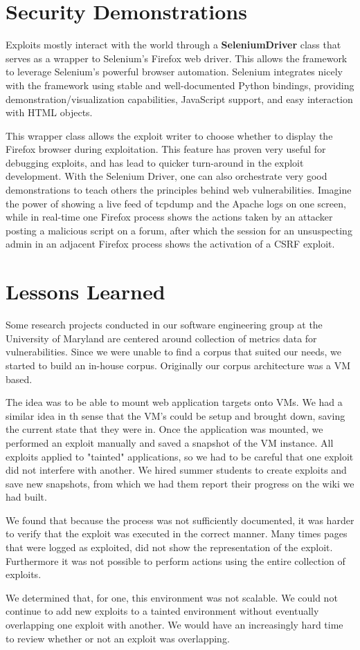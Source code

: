 \documentclass[letterpaper,twocolumn,10pt]{article}
\begin{document}
\section{Security Demonstrations}

Exploits mostly interact with the world through a {\bf SeleniumDriver} class that serves as a wrapper to Selenium's Firefox web driver. This allows the framework to leverage Selenium's powerful browser automation. Selenium integrates nicely with the framework using stable and well-documented Python bindings, providing demonstration/visualization capabilities, JavaScript support, and easy interaction with HTML objects.\par
This wrapper class allows the exploit writer to choose whether to display the Firefox browser during exploitation. This feature has proven very useful for debugging exploits, and has lead to quicker turn-around in the exploit development. With the Selenium Driver, one can also orchestrate very good demonstrations to teach others the principles behind web vulnerabilities. Imagine the power of showing a live feed of tcpdump and the Apache logs on one screen, while in real-time one Firefox process shows the actions taken by an attacker posting a malicious script on a forum, after which the session for an unsuspecting admin in an adjacent Firefox process shows the activation of a CSRF exploit. 

\section{Lessons Learned}

Some research projects conducted in our software engineering group at the University of Maryland are centered around collection of metrics data for vulnerabilities.  Since we were unable to find a corpus that suited our needs, we started to build an in-house corpus.  Originally our corpus architecture was a VM based. \par
The idea was to be able to mount web application targets onto VMs.  We had a similar idea in th sense that the VM's could be setup and brought down, saving the current state that they were in.  Once the application was mounted, we performed an exploit manually and saved a snapshot of the VM instance.  All exploits applied to "tainted" applications, so we had to be careful that one exploit did not interfere with another.  We hired summer students to create exploits and save new snapshots, from which we had them report their progress on the wiki we had built.\par
We found that because the process was not sufficiently documented, it was harder to verify that the exploit was executed in the correct manner.  Many times pages that were logged as exploited, did not show the representation of the exploit. Furthermore it was not possible to perform actions using the entire collection of exploits.\par
We determined that, for one, this environment was not scalable.  We could not continue to add new exploits to a tainted environment without eventually overlapping one exploit with another.  We would have an increasingly hard time to review whether or not an exploit was overlapping.\par
\end{document}
